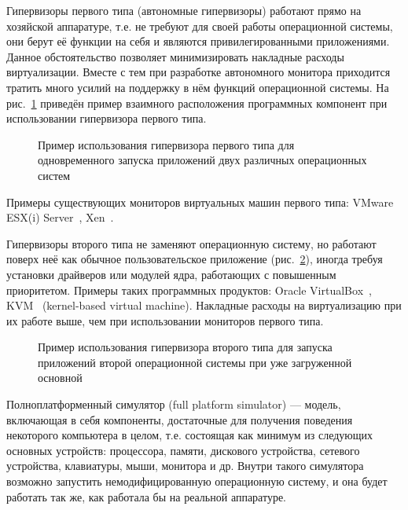 \begin{description*}
\item[Гипервизоры первого типа] (автономные гипервизоры) работают прямо на хозяйской аппаратуре, т.е. не требуют для своей работы операционной системы, они берут её функции на себя и являются привилегированными приложениями. Данное обстоятельство позволяет минимизировать накладные расходы виртуализации. Вместе с тем при разработке автономного монитора приходится тратить много усилий на поддержку в нём функций операционной системы. На рис.~\ref{fig:vm-type1} приведён пример взаимного расположения программных компонент при использовании гипервизора первого типа.

\begin{figure}[htp]
\centering
{}
\caption[Гипервизор первого типа]{Пример использования гипервизора первого типа для одновременного запуска приложений двух различных операционных систем}\label{fig:vm-type1}
\end{figure}

Примеры существующих мониторов виртуальных машин первого типа: VMware ESX(i) Server~\cite{vmware-esx}, Xen~\cite{xen2006}.

\item[Гипервизоры второго типа] не заменяют операционную систему, но работают поверх неё как обычное пользовательское приложение (рис.~\ref{fig:vm-type2}), иногда требуя установки драйверов или модулей ядра, работающих с повышенным приоритетом. Примеры таких программных продуктов: Oracle VirtualBox~\cite{virtualbox}, KVM~\cite{kvm-wiki} (\abbr kernel-based virtual machine). Накладные расходы на виртуализацию при их работе выше, чем при использовании мониторов первого типа.

\begin{figure}[htp]
    \centering
    \caption[Гипервизор второго типа]{Пример использования гипервизора второго типа для запуска приложений второй операционной системы при уже загруженной основной}\label{fig:vm-type2}
\end{figure}

\item[Полноплатформенный симулятор] (\abbr full platform si\-mu\-la\-tor) --- модель, включающая в себя компоненты, достаточные для получения поведения некоторого компьютера в целом, т.е. состоящая как минимум из следующих основных устройств: процессора, памяти, дискового устройства, сетевого устройства, клавиатуры, мыши, монитора и др. Внутри такого симулятора возможно запустить немодифицированную операционную систему, и она будет работать так же, как работала бы на реальной аппаратуре.


\end{description*}

